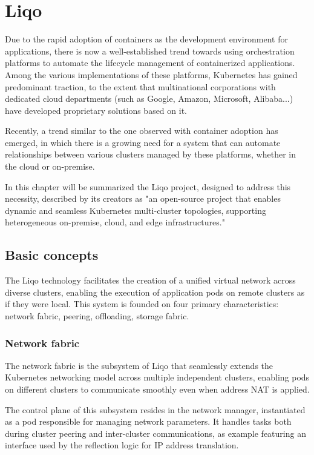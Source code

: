 \chapter{Liqo}
Due to the rapid adoption of containers as the development environment for applications, there is now a well-established trend towards using orchestration platforms to automate the lifecycle management of containerized applications. Among the various implementations of these platforms, Kubernetes has gained predominant traction, to the extent that multinational corporations with dedicated cloud departments (such as Google, Amazon, Microsoft, Alibaba...) have developed proprietary solutions based on it. 

Recently, a trend similar to the one observed with container adoption has emerged, in which there is a growing need for a system that can automate relationships between various clusters managed by these platforms, whether in the cloud or on-premise. 

In this chapter will be summarized the Liqo project, designed to address this necessity, described by its creators \cite{l0-1} as "an open-source project that enables dynamic and seamless Kubernetes multi-cluster topologies, supporting heterogeneous on-premise, cloud, and edge infrastructures."

\section{Basic concepts}
The Liqo technology facilitates the creation of a unified virtual network across diverse clusters, enabling the execution of application pods on remote clusters as if they were local. This system is founded on four primary characteristics: network fabric, peering, offloading, storage fabric.

\subsection{Network fabric}
The network fabric is the subsystem of Liqo that seamlessly extends the Kubernetes networking model across multiple independent clusters, enabling pods on different clusters to communicate smoothly even when address NAT is applied.

The control plane of this subsystem resides in the network manager, instantiated as a pod responsible for managing network parameters. It handles tasks both during cluster peering and inter-cluster communications, as example featuring an interface used by the reflection logic for IP address translation.

